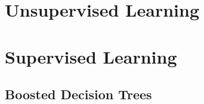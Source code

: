 
\section{Unsupervised Learning}
\label{ml:unsupervised}



\section{Supervised Learning}
\label{ml:supervised}



\subsection{Boosted Decision Trees}
\label{ml:supervised:BDT}
\xgboost \cite{xgboost}

